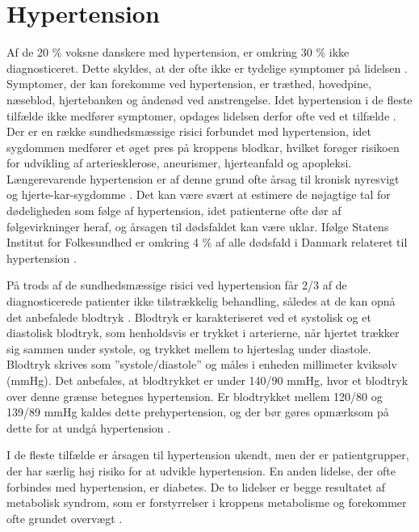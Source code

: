 \section{Hypertension}

Af de 20 \% voksne danskere med hypertension, er omkring 30 \% ikke diagnosticeret. Dette skyldes, at der ofte ikke er tydelige symptomer på lidelsen \cite{kronborg2008}. Symptomer, der kan forekomme ved hypertension, er træthed, hovedpine, næseblod, hjertebanken og åndenød ved anstrengelse. Idet hypertension i de fleste tilfælde ikke medfører symptomer, opdages lidelsen derfor ofte ved et tilfælde \cite{olsen2015}.
Der er en række sundhedsmæssige risici forbundet med hypertension, idet sygdommen medfører et øget pres på kroppens blodkar, hvilket forøger risikoen for udvikling af arteriesklerose, aneurismer, hjerteanfald og apopleksi. Længerevarende hypertension er af denne grund ofte årsag til kronisk nyresvigt og hjerte-kar-sygdomme \cite{martini2015}. Det kan være svært at estimere de nøjagtige tal for dødeligheden som følge af hypertension, idet patienterne ofte dør af følgevirkninger heraf, og årsagen til dødsfaldet kan være uklar. Ifølge Statens Institut for Folkesundhed er omkring 4 \% af alle dødsfald i Danmark relateret til hypertension \cite{juel2006}.
 
På trods af de sundhedsmæssige risici ved hypertension får 2/3 af de diagnosticerede patienter ikke tilstrækkelig behandling, således at de kan opnå det anbefalede blodtryk \cite{paulsen2012}.
Blodtryk er karakteriseret ved et systolisk og et diastolisk blodtryk, som henholdsvis er trykket i arterierne, når hjertet trækker sig sammen under systole, og trykket mellem to hjerteslag under diastole. Blodtryk skrives som ”systole/diastole” og måles i enheden millimeter kviksølv (mmHg). Det anbefales, at blodtrykket er under 140/90 mmHg, hvor et blodtryk over denne grænse betegnes hypertension. Er blodtrykket mellem 120/80 og 139/89 mmHg kaldes dette prehypertension, og der bør gøres opmærksom på dette for at undgå hypertension \cite{martini2015}.

I de fleste tilfælde er årsagen til hypertension ukendt, men der er patientgrupper, der har særlig høj risiko for at udvikle hypertension. En anden lidelse, der ofte forbindes med hypertension, er diabetes. De to lidelser er begge resultatet af metabolisk syndrom, som er forstyrrelser i kroppens metabolisme og forekommer ofte grundet overvægt \cite{cheung2012}.

